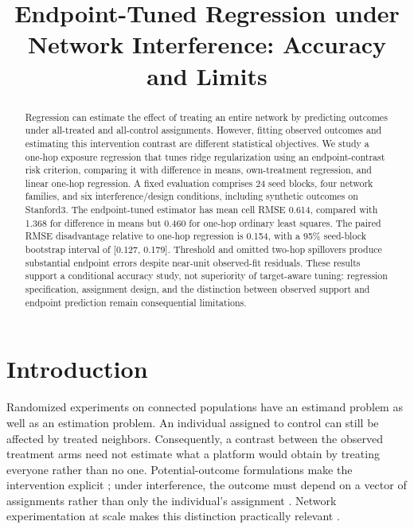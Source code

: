 \documentclass{article}
\title{Endpoint-Tuned Regression under Network Interference: Accuracy and Limits}
\author{}
\begin{document}
\maketitle

\begin{abstract}
Regression can estimate the effect of treating an entire network by predicting outcomes under all-treated and all-control assignments. However, fitting observed outcomes and estimating this intervention contrast are different statistical objectives. We study a one-hop exposure regression that tunes ridge regularization using an endpoint-contrast risk criterion, comparing it with difference in means, own-treatment regression, and linear one-hop regression. A fixed evaluation comprises 24 seed blocks, four network families, and six interference/design conditions, including synthetic outcomes on Stanford3. The endpoint-tuned estimator has mean cell RMSE 0.614, compared with 1.368 for difference in means but 0.460 for one-hop ordinary least squares. The paired RMSE disadvantage relative to one-hop regression is 0.154, with a 95\% seed-block bootstrap interval of [0.127, 0.179]. Threshold and omitted two-hop spillovers produce substantial endpoint errors despite near-unit observed-fit residuals. These results support a conditional accuracy study, not superiority of target-aware tuning: regression specification, assignment design, and the distinction between observed support and endpoint prediction remain consequential limitations.
\end{abstract}

\section{Introduction}
Randomized experiments on connected populations have an estimand problem as well as an estimation problem. An individual assigned to control can still be affected by treated neighbors. Consequently, a contrast between the observed treatment arms need not estimate what a platform would obtain by treating everyone rather than no one. Potential-outcome formulations make the intervention explicit \citep{Neyman1990,Rubin1974}; under interference, the outcome must depend on a vector of assignments rather than only the individual's assignment \citep{Hudgens2008,Manski2013}. Network experimentation at scale makes this distinction practically relevant \citep{Karrer2021}.
\end{document}
